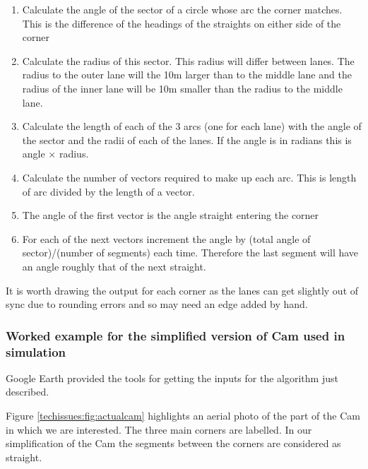       \begin{enumerate}
        \item Calculate the angle of the sector of a circle whose arc the corner matches. This is the difference of the headings of the straights on either side of the corner
        
        \item Calculate the radius of this sector. This radius will differ between lanes. The radius to the outer lane will the 10m larger than to the middle lane and the radius of the inner lane will be 10m smaller than the radius to the middle lane. 
        
        \item Calculate the length of each of the 3 arcs (one for each lane) with the angle of the sector and the radii of each of the lanes. If the angle is in radians this is angle $\times$ radius.
        
        \item Calculate the number of vectors required to make up each arc. This is length of arc divided by the length of a vector. 
        
        \item The angle of the first vector is the angle straight entering the corner
        
        \item For each of the next vectors increment the angle by (total angle of sector)/(number of segments) each time. Therefore the last segment will have an angle roughly that of the next straight.
      \end{enumerate}
      
       It is worth drawing the output for each corner as the lanes can get slightly out of sync due to rounding errors and so may need an edge added by hand.
      
      \subsubsection{Worked example for the simplified version of Cam used in simulation}
      Google Earth provided the tools for getting the inputs for the algorithm just described.
      
      Figure \ref{techissues:fig:actualcam} highlights an aerial photo of the part of the Cam in which we are interested. The three main corners are labelled. In our simplification of the Cam the segments between the corners are considered as straight.
      
